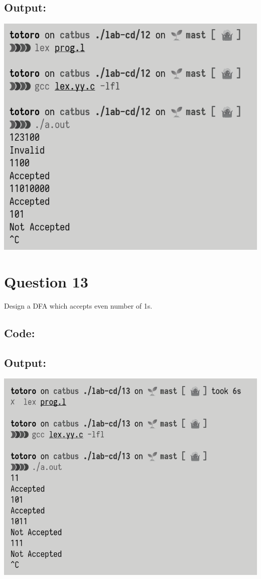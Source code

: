 \documentclass{article}
\begin{document}
\subsection*{Output:}
\begin{center}
  \includegraphics[width=14cm]{12/out.png}
\end{center}

\newpage
\section*{Question 13}
Design a DFA which accepts even number of 1s.
\subsection*{Code:}

\newpage
\subsection*{Output:}
\begin{center}
  \includegraphics[width=14cm]{13/out.png}
\end{center}
\end{document}
